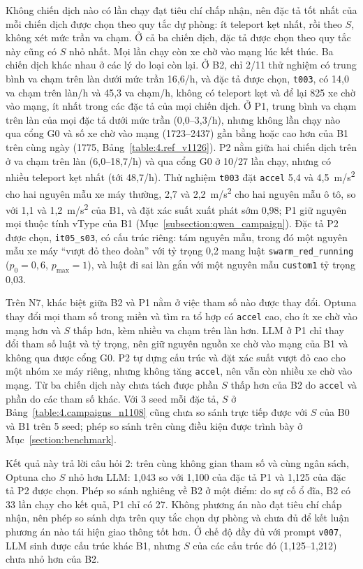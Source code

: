 \documentclass[../main.tex]{subfiles}
\begin{document}
Không chiến dịch nào có lần chạy đạt tiêu chí chấp nhận, nên đặc tả tốt nhất của mỗi chiến dịch được chọn theo quy tắc dự phòng: ít teleport kẹt nhất, rồi theo $S$, không xét mức trần va chạm. Ở cả ba chiến dịch, đặc tả được chọn theo quy tắc này cũng có $S$ nhỏ nhất. Mọi lần chạy còn xe chờ vào mạng lúc kết thúc. Ba chiến dịch khác nhau ở các lý do loại còn lại. Ở B2, chỉ 2/11 thử nghiệm có trung bình va chạm trên làn dưới mức trần 16,6/h, và đặc tả được chọn, \texttt{t003}, có 14,0 va chạm trên làn/h và 45,3 va chạm/h, không có teleport kẹt và để lại 825 xe chờ vào mạng, ít nhất trong các đặc tả của mọi chiến dịch. Ở P1, trung bình va chạm trên làn của mọi đặc tả dưới mức trần (0,0--3,3/h), nhưng không lần chạy nào qua cổng G0 và số xe chờ vào mạng (1723--2437) gần bằng hoặc cao hơn của B1 trên cùng ngày (1775, Bảng~\ref{table:4.ref_v1126}). P2 nằm giữa hai chiến dịch trên ở va chạm trên làn (6,0--18,7/h) và qua cổng G0 ở 10/27 lần chạy, nhưng có nhiều teleport kẹt nhất (tới 48,7/h). Thử nghiệm \texttt{t003} đặt \texttt{accel} 5,4 và 4,5~m/s\textsuperscript{2} cho hai nguyên mẫu xe máy thường, 2,7 và 2,2~m/s\textsuperscript{2} cho hai nguyên mẫu ô tô, so với 1,1 và 1,2~m/s\textsuperscript{2} của B1, và đặt xác suất xuất phát sớm 0,98; P1 giữ nguyên mọi thuộc tính vType của B1 (Mục~\ref{subsection:qwen_campaign}). Đặc tả P2 được chọn, \texttt{it05\_s03}, có cấu trúc riêng: tám nguyên mẫu, trong đó một nguyên mẫu xe máy ``vượt đỏ theo đoàn'' với tỷ trọng 0,2 mang luật \texttt{swarm\_red\_running} ($p_0 = 0{,}6$, $p_{\max} = 1$), và luật đi sai làn gắn với một nguyên mẫu \texttt{custom1} tỷ trọng 0,03.

Trên N7, khác biệt giữa B2 và P1 nằm ở việc tham số nào được thay đổi. Optuna thay đổi mọi tham số trong miền và tìm ra tổ hợp có \texttt{accel} cao, cho ít xe chờ vào mạng hơn và $S$ thấp hơn, kèm nhiều va chạm trên làn hơn. LLM ở P1 chỉ thay đổi tham số luật và tỷ trọng, nên giữ nguyên nguồn xe chờ vào mạng của B1 và không qua được cổng G0. P2 tự dựng cấu trúc và đặt xác suất vượt đỏ cao cho một nhóm xe máy riêng, nhưng không tăng \texttt{accel}, nên vẫn còn nhiều xe chờ vào mạng. Từ ba chiến dịch này chưa tách được phần $S$ thấp hơn của B2 do \texttt{accel} và phần do các tham số khác. Với 3 seed mỗi đặc tả, $S$ ở Bảng~\ref{table:4.campaigns_n1108} cũng chưa so sánh trực tiếp được với $S$ của B0 và B1 trên 5 seed; phép so sánh trên cùng điều kiện được trình bày ở Mục~\ref{section:benchmark}.

Kết quả này trả lời câu hỏi 2: trên cùng không gian tham số và cùng ngân sách, Optuna cho $S$ nhỏ hơn LLM: 1,043 so với 1,100 của đặc tả P1 và 1,125 của đặc tả P2 được chọn. Phép so sánh nghiêng về B2 ở một điểm: do sự cố ổ đĩa, B2 có 33 lần chạy cho kết quả, P1 chỉ có 27. Không phương án nào đạt tiêu chí chấp nhận, nên phép so sánh dựa trên quy tắc chọn dự phòng và chưa đủ để kết luận phương án nào tái hiện giao thông tốt hơn. Ở chế độ đầy đủ với prompt \texttt{v007}, LLM sinh được cấu trúc khác B1, nhưng $S$ của các cấu trúc đó (1,125--1,212) chưa nhỏ hơn của B2.
\end{document}
